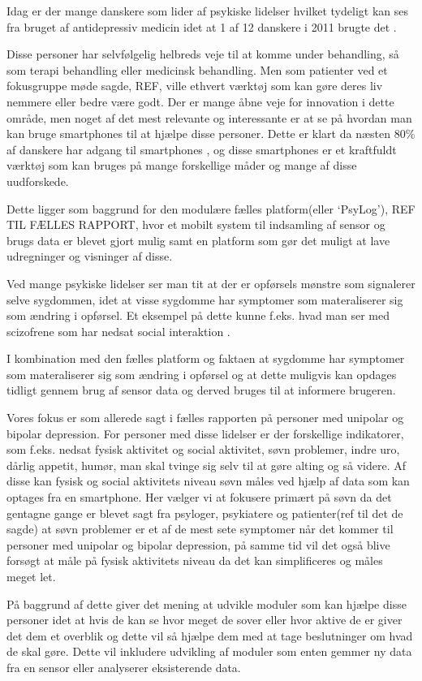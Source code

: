 Idag er der mange danskere som lider af psykiske lidelser hvilket tydeligt kan ses fra bruget af antidepressiv medicin idet at 1 af 12 danskere i 2011 brugte det \citep{misc:forbrugAntidepressiva}. 

Disse personer har selvfølgelig helbreds veje til at komme under behandling, så som terapi behandling eller medicinsk behandling.
Men som patienter ved et fokusgruppe møde sagde, REF, ville ethvert værktøj som kan gøre deres liv nemmere eller bedre være godt.
Der er mange åbne veje for innovation i dette område, men noget af det mest relevante og interessante er at se på hvordan man kan bruge smartphones til at hjælpe disse personer.
Dette er klart da næsten 80\% af danskere har adgang til smartphones \citep{misc:dstElektronik}, og disse smartphones er et kraftfuldt værktøj som kan bruges på mange forskellige måder og mange af disse uudforskede.

Dette ligger som baggrund for den modulære fælles platform(eller `PsyLog'), REF TIL FÆLLES RAPPORT, hvor et mobilt system til indsamling af sensor og brugs data er blevet gjort mulig samt en platform som gør det muligt at lave udregninger og visninger af disse.

Ved mange psykiske lidelser ser man tit at der er opførsels mønstre som signalerer selve sygdommen, idet at visse sygdomme har symptomer som materaliserer sig som ændring i opførsel.
Et eksempel på dette kunne f.eks. hvad man ser med scizofrene som har nedsat social interaktion \citep{misc:negativeSymptomsSchizo}. 

I kombination med den fælles platform og faktaen at sygdomme har symptomer som materaliserer sig som ændring i opførsel og at dette muligvis kan opdages tidligt gennem brug af sensor data og derved bruges til at informere brugeren. 

Vores fokus er som allerede sagt i fælles rapporten på personer med unipolar og bipolar depression. 
For personer med disse lidelser er der forskellige indikatorer, som f.eks. nedsat fysisk aktivitet og social aktivitet, søvn problemer, indre uro, dårlig appetit, humør, man skal tvinge sig selv til at gøre alting og så videre. %
Af disse kan fysisk og social aktivitets niveau søvn måles ved hjælp af data som kan optages fra en smartphone. 
Her vælger vi at fokusere primært på søvn da det gentagne gange er blevet sagt fra psyloger, psykiatere og patienter(ref til det de sagde) at søvn problemer er et af de mest sete symptomer når det kommer til personer med unipolar og bipolar depression, på samme tid vil det også blive forsøgt at måle på fysisk aktivitets niveau da det kan simplificeres og måles meget let.

På baggrund af dette giver det mening at udvikle moduler som kan hjælpe disse personer idet at hvis de kan se hvor meget de sover eller hvor aktive de er giver det dem et overblik og dette vil så hjælpe dem med at tage beslutninger om hvad de skal gøre. 
Dette vil inkludere udvikling af moduler som enten gemmer ny data fra en sensor eller analyserer eksisterende data.